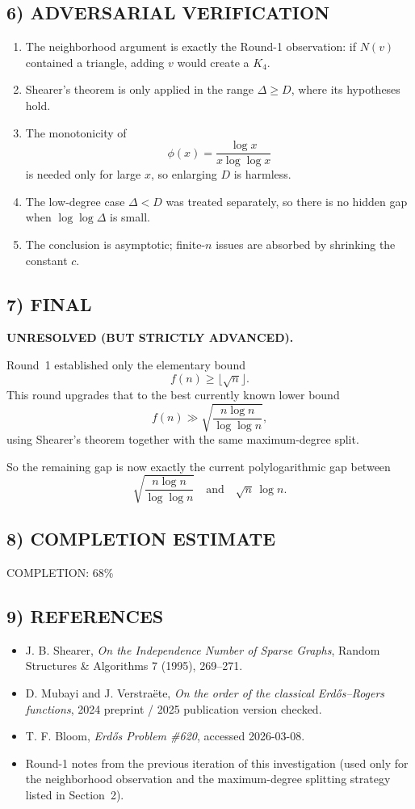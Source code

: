 \subsection*{6) ADVERSARIAL VERIFICATION}

\begin{enumerate}
\item The neighborhood argument is exactly the Round-1 observation: if $N(v)$ contained a triangle, adding $v$ would create a $K_4$.
\item Shearer's theorem is only applied in the range $\Delta\ge D$, where its hypotheses hold.
\item The monotonicity of
\[
\phi(x)=\frac{\log x}{x\log\log x}
\]
is needed only for large $x$, so enlarging $D$ is harmless.
\item The low-degree case $\Delta<D$ was treated separately, so there is no hidden gap when $\log\log \Delta$ is small.
\item The conclusion is asymptotic; finite-$n$ issues are absorbed by shrinking the constant $c$.
\end{enumerate}

\subsection*{7) FINAL}

\textbf{UNRESOLVED (BUT STRICTLY ADVANCED).}

Round~1 established only the elementary bound
\[
f(n)\ge \lfloor \sqrt n\rfloor.
\]
This round upgrades that to the best currently known lower bound
\[
f(n)\gg \sqrt{\frac{n\log n}{\log\log n}},
\]
using Shearer's theorem together with the same maximum-degree split.

So the remaining gap is now exactly the current polylogarithmic gap between
\[
\sqrt{\frac{n\log n}{\log\log n}}
\quad\text{and}\quad
\sqrt n\,\log n.
\]

\subsection*{8) COMPLETION ESTIMATE}

COMPLETION: 68\%

\subsection*{9) REFERENCES}

\begin{itemize}
\item J. B. Shearer, \emph{On the Independence Number of Sparse Graphs}, Random Structures \& Algorithms 7 (1995), 269--271.
\item D. Mubayi and J. Verstra\"ete, \emph{On the order of the classical Erd\H{o}s--Rogers functions}, 2024 preprint / 2025 publication version checked.
\item T. F. Bloom, \emph{Erd\H{o}s Problem \#620}, accessed 2026-03-08.
\item Round-1 notes from the previous iteration of this investigation (used only for the neighborhood observation and the maximum-degree splitting strategy listed in Section~2).
\end{itemize}
